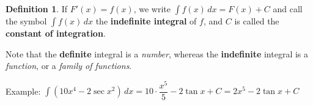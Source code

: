 \documentclass[t]{beamer}
\theoremstyle{plain}
\theoremstyle{definition}
\newtheorem{dfn}{Definition}
\newcommand{\ds}{\displaystyle}
\newcounter{heading}
\newcommand{\newhead}[1]{\medskip\stepcounter{heading}\noindent\textbf{\hspace{0.2cm}{#1}.}}
\begin{document}
\begin{frame}

\begin{dfn} If $F'(x) = f(x)$, we write $\int f(x)\, dx = F(x)+C$ and call the symbol $\int f(x)\, dx$ the \textbf{indefinite integral} of $f$, and $C$ is called the \textbf{constant of integration}.\end{dfn}

\medskip

\noindent Note that the \textbf{definite} integral is a \emph{number}, whereas the \textbf{indefinite} integral is a \emph{function}, or a \emph{family of functions}. 

\medskip

Example: $\ds\int (10x^4 - 2\sec{x}^2) \, dx = 10\cdot \dfrac{x^5}{5} - 2 \tan{x} + C = 2x^5 - 2 \tan{x} + C$

\end{frame}

%
%
%
\end{document}
